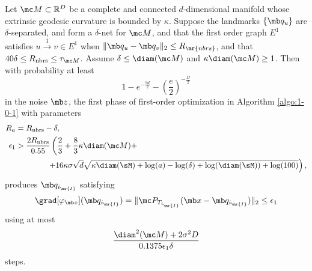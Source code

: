 \begin{proposition}\label{prop:phase I}
 Let $\mc M \subset \mathbb{R}^D$ be a complete and connected $d$-dimensional manifold whose extrinsic geodesic curvature is bounded by $\kappa$. Suppose the landmarks $\{ \mb q_u \}$ are $\delta$-separated, and form a $\delta$-net for $\mc M$, and that the first order graph $E^1$ satisfies $u \overset{1}{\rightarrow} v \in E^1$ when $\| \mb q_u - \mb q_v \|_2 \le R_{\mr{nbrs}}$, and that $40 \delta \le R_{\text{nbrs}} \le \tau_{\mc M}$. Assume $\delta \leq \diam(\mc M)$ and $\kappa \diam(\mc M) \geq 1$. Then with probability at least 
  \begin{equation}
      1-e^{-\frac{9d}{2}} - \left(\frac{e}{2}\right)^{-\frac{D}{2}}
  \end{equation}
  in the noise $\mb z$, the first phase of first-order optimization in Algorithm \ref{algo:1-0-1} with parameters  
  \begin{align}
        R_a &= R_{\text{nbrs}}-\delta,  \\
      \epsilon_1 &>  \frac{2R_{\text{nbrs}}}{0.55}\left(\frac{2}{3} + \frac{8}{3}\kappa \diam(\mc M) + \right.\\
      &\qquad \qquad \left. + 16\kappa\sigma\sqrt{d}\sqrt{\kappa \diam(\sM) + \log(a) - \log(\delta) + \log(\diam(\sM)) + \log(100)}\right), \\ 
  \end{align}
  produces $\mb q_{i_{\mr{I}}}$ satisfying 
  \begin{equation}
        \grad[\varphi_{\mb x}](\mb q_{i_{\mr{I}}})
        =\| \mc P_{T_{i_{\mr{I}}}}(\mb x - \mb q_{i_{\mr{I}}}) \|_2 
        \leq \epsilon_1
    \end{equation}
    using at most 
    \begin{equation}
        \frac{\diam^2(\mc M) + 2 \sigma^2 D} {0.1375 \epsilon_1 \delta}
    \end{equation}
    steps. 
\end{proposition}


